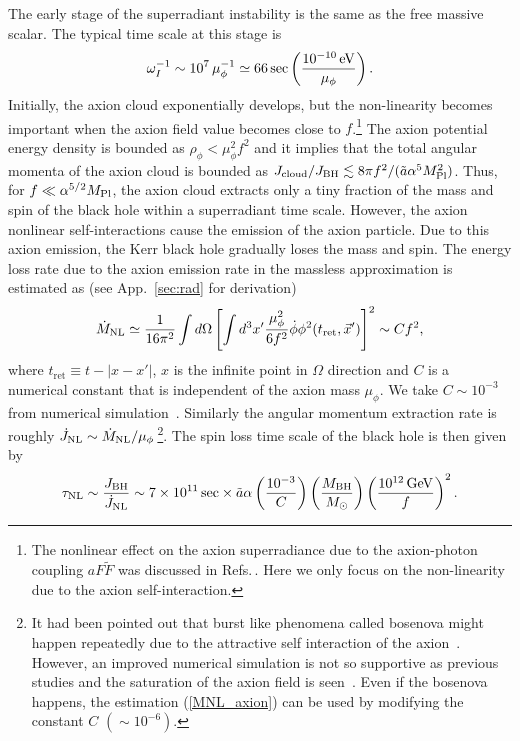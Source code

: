 \documentclass[%
 preprint,
 nofootinbib,
 amsmath,amssymb,
 aps,
 a4paper
]{revtex4-1}
\begin{document}
The early stage of the superradiant instability is the same as the free massive scalar. 
The typical time scale at this stage is
\begin{align}
	\omega_I^{-1} \sim 10^7\,\mu_\phi^{-1} \simeq 66\,{\rm sec}\left(\frac{10^{-10}\,{\rm eV}}{\mu_\phi}\right).
\end{align}
Initially, the axion cloud exponentially develops, but the non-linearity becomes important when the axion field value becomes close to $f$.\footnote{
	The nonlinear effect on the axion superradiance due to the axion-photon coupling $a F \widetilde F$ was discussed in Refs.\,\cite{Rosa:2017ury,Boskovic:2018lkj,Ikeda:2019fvj}. Here we only focus on the non-linearity due to the axion self-interaction. 
} The axion potential energy density is bounded as $\rho_\phi < \mu_\phi^2 f^2$ and it implies that the total angular momenta of the axion cloud is bounded as $J_{\rm cloud} / J_{\rm BH} \lesssim 8\pi f^2/(\tilde{a} \alpha^5 M_{\rm Pl}^2)$.
Thus, for $f\ll \alpha^{5/2} M_{\rm Pl}$, the axion cloud extracts only a tiny fraction of the mass and spin of the black hole within a superradiant time scale. However, the axion nonlinear self-interactions cause the emission of the axion particle. Due to this axion emission, the Kerr black hole gradually loses the mass and spin.
The energy loss rate due to the axion emission rate in the massless approximation is estimated as (see App.~\ref{sec:rad} for derivation)
\begin{align}
	\dot M_{\rm NL} \simeq \frac{1}{16\pi^2}\int d\Omega \left[\int d^3 x' \frac{\mu_\phi^2}{6f^2}\dot \phi \phi^2(t_{\rm ret},\vec x') \right]^2
	\sim C f^{2},
	\label{MNL_axion}
\end{align}
where $t_\text{ret} \equiv t - |x - x'|$, $x$ is the infinite point in $\Omega$ direction and $C$ is a numerical constant that is independent of the axion mass $\mu_\phi$.
We take $C\sim 10^{-3}$ from numerical simulation~\cite{Yoshino:2012kn}. Similarly the angular momentum extraction rate is roughly $\dot J_{\rm NL} \sim \dot M_{\rm NL}/ \mu_\phi$\,\footnote{
	It had been pointed out that burst like phenomena called bosenova might happen repeatedly due to the attractive self interaction of the axion~\cite{Arvanitaki:2010sy,Yoshino:2012kn,Yoshino:2013ofa,Arvanitaki:2014wva}. However, an improved numerical simulation is not so supportive as previous studies and the saturation of the axion field is seen~\cite{Yoshino:2019}. Even if the bosenova happens, the estimation (\ref{MNL_axion}) can be used by modifying the constant $C$ $(\sim 10^{-6})$.  
}.
The spin loss time scale of the black hole is then given by
\begin{align}
	\tau_{\rm NL} \sim \frac{J_{\rm BH}}{\dot J_{\rm NL}} \sim 7\times 10^{11}\,{\rm sec}\times\tilde a \alpha \left( \frac{10^{-3}}{C} \right)
	\left( \frac{M_{\rm BH}}{M_\odot} \right)
	\left( \frac{10^{12}\,{\rm GeV}}{f} \right)^2. 
\end{align}
\end{document}
